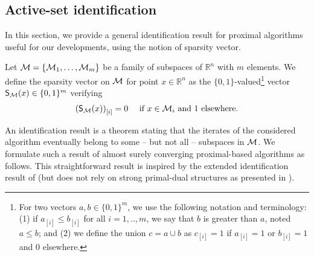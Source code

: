 \subsection{Active-set identification}
In this section, we provide a general identification result for proximal algorithms useful for our developments, using the notion of sparsity vector.

\begin{definition}\label{def:sparsity}
Let $\M= \{ \M_1,\ldots,\M_m\}$ be a family of subspaces of $\mathbb{R}^n$ with $m$ elements. We define the {sparsity vector} on $\M$ for point $x\in\mathbb{R}^n$ as the $\{0,1\}$-valued\footnote{For two vectors $a,b\in\{0,1\}^m$, we use the following notation and terminology: (1) if  $a_{[i]} \leq b_{[i]}$ for all $i=1,..,m$, we say that $b$ is greater than $a$, noted $a\leq b$; and (2) we define the union $c = a\cup b$ as $c_{[i]} = 1 $ if $a_{[i]} = 1$ or $b_{[i]}=1$ and $0$ elsewhere.} vector  $\S(x)\in \{0,1\}^m$ verifying
\begin{align}\label{eq:strata}
    \left( \S(x) \right)_{[i]} = 0 \quad\text{ if } x \in \M_i \text{ and } 1 \text{ elsewhere}.
\end{align}
\end{definition}

An identification result is a theorem stating that the iterates of the considered algorithm eventually belong to some -- but not all -- subspaces in $\M$. We formulate such a result of almost surely converging proximal-based algorithms as follows. This straightforward result is inspired by the extended identification result of \cite{fadili2018sensitivity} (but does not rely on strong primal-dual structures as presented in \cite{fadili2018sensitivity}).

